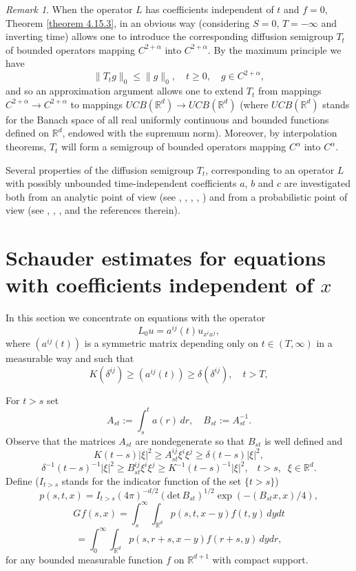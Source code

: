 \documentclass[reqno,12pt]{amsart}
\theoremstyle{definition}
\theoremstyle{remark}
\newtheorem{remark}[theorem]{Remark}
\begin{document}
\begin{remark} \label{cauchy}
   When  the operator $L$ has  coefficients independent of $t$ and
   $f =0$,
   Theorem \ref{theorem
   4.15.3}, in an obvious way (considering $S=0$, $T = - \infty$
    and inverting  time)
   allows one to introduce the
corresponding diffusion semigroup $T_{t}$ of bounded operators
mapping $C^{2+\alpha} $ into $C^{2+\alpha} $. By the
maximum principle we have
$$
\|T_{t}g\|_{0}\leq\|g\|_{0},\quad t \ge 0 ,\quad  g \in C^{2+
\alpha} ,
$$
and so an
   approximation argument allows one to extend $T_{t}$ from mappings
$C^{2+\alpha}  \to C^{2+\alpha} $ to mappings
$UCB({\mathbb{R}}^d)\to UCB({\mathbb{R}}^d)$ (where $UCB({\mathbb{R}}^d)$ stands for the
Banach space of all real uniformly continuous and bounded
functions defined  on ${\mathbb{R}}^d$, endowed with the supremum norm).
Moreover, by interpolation theorems, $T_t$ will form a semigroup
of bounded operators mapping $C^{\alpha} $ into
$C^{\alpha} $.

   Several properties of the  diffusion
   semigroup $T_t$, corresponding to an operator
   $L$ with possibly unbounded
   time-independent coefficients
   $a$, $b$ and $c$ are investigated both  from an analytic point of
view (see  \cite{BL}
   \cite{CV}, \cite{DL}, \cite{Lu1}, \cite{LV},  \cite{MPW}) and from a
   probabilistic point of view  (see \cite{Ce0}, \cite{Ce}, \cite{DG},
   and the references therein).
\end{remark}

{\section{{Schauder estimates for equations with coefficients
independent of $x$}}
\setcounter{equation}{0}}
                                           \label{section 4.16.2}

   In this section we concentrate on equations with the operator
$$
L_{0} u=a^{ij}(t)u_{x^{i}x^{j}},
$$
where $(a^{ij}(t))$ is a symmetric   matrix depending only on $t
\in (T, \infty)$ in a measurable way and such that
$$
K (\delta^{ij}) \geq(a^{ij} (t))\geq\delta (\delta^{ij}),
 \quad t > T,
$$

   For $t>s$ set
$$
A_{st}:=\int_{s}^{t}a(r)\,dr,\quad B_{st}:=A_{st}^{-1}.
$$
Observe that the matrices $A_{st}$ are  nondegenerate so that
$B_{st}$ is well defined and
$$
K(t-s)|\xi|^{2}\geq A_{st}^{ij} \xi^{i}\xi^{j}
\geq\delta(t-s)|\xi|^{2},
$$
$$
\delta^{-1}(t-s)^{-1}|\xi|^{2}\geq B_{st}^{ij} \xi^{i}\xi^{j} \geq
K^{-1}(t-s)^{-1}|\xi|^{2},\;\;\; t>s,\;\; \xi \in {\mathbb{R}}^d.
$$
Define ($I_{t>s}$ stands for the indicator function of the set
$\{t>s\}$)
\begin{equation} \label{pp}
p(s, t,x)=I_{t>s}(4\pi)^{-d/2}
(\text{det}\,B_{st})^{1/2}\exp(-(B_{st}x,x)/4),
\end{equation}
$$
G_{}f(s,x)=\int_{s}^{\infty}\int_{{\mathbb{R}}^{d}} p(s,t,x-y)f(t,y) \,dydt
$$
$$
= \int_{0}^{\infty}\int_{{\mathbb{R}}^{d}} p(s,r+s,x-y)f(r+s,y) \,dydr,
$$
for any bounded measurable function $f$  on ${\mathbb{R}}^{d+1}$  with
compact support.
\end{document}
